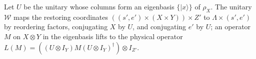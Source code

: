 \begin{definition}
    \label{def:al_amp_ancilla_transport}
    \leanok
    Let $U$ be the unitary whose columns form an eigenbasis $\{|x\rangle\}$ of
    $\rho_X$. The unitary $\mathcal W$ maps the restoring coordinates
    $((s',e')\times(X\times Y))\times Z'$ to $\Lambda\times(s',e')$ by
    reordering factors, conjugating $X$ by $U$, and conjugating $e'$ by $U$;
    an operator $M$ on $X\otimes Y$ in the eigenbasis lifts to the physical
    operator $L(M)=((U\otimes I_Y)M(U\otimes I_Y)^\dagger)\otimes I_{Z'}$.
\end{definition}


